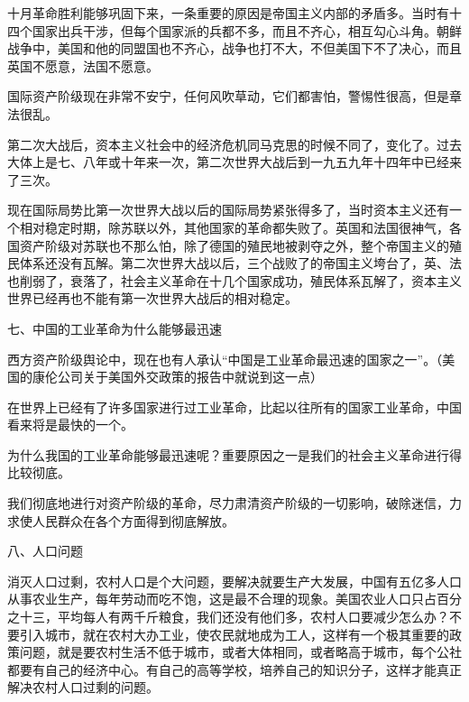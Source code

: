 十月革命胜利能够巩固下来，一条重要的原因是帝国主义内部的矛盾多。当时有十四个国家出兵干涉，但每个国家派的兵都不多，而且不齐心，相互勾心斗角。朝鲜战争中，美国和他的同盟国也不齐心，战争也打不大，不但美国下不了决心，而且英国不愿意，法国不愿意。

国际资产阶级现在非常不安宁，任何风吹草动，它们都害怕，警惕性很高，但是章法很乱。

第二次大战后，资本主义社会中的经济危机同马克思的时候不同了，变化了。过去大体上是七、八年或十年来一次，第二次世界大战后到一九五九年十四年中已经来了三次。

现在国际局势比第一次世界大战以后的国际局势紧张得多了，当时资本主义还有一个相对稳定时期，除苏联以外，其他国家的革命都失败了。英国和法国很神气，各国资产阶级对苏联也不那么怕，除了德国的殖民地被剥夺之外，整个帝国主义的殖民体系还没有瓦解。第二次世界大战以后，三个战败了的帝国主义垮台了，英、法也削弱了，衰落了，社会主义革命在十几个国家成功，殖民体系瓦解了，资本主义世界已经再也不能有第一次世界大战后的相对稳定。

七、中国的工业革命为什么能够最迅速

西方资产阶级舆论中，现在也有人承认“中国是工业革命最迅速的国家之一”。（美国的康伦公司关于美国外交政策的报告中就说到这一点）

在世界上已经有了许多国家进行过工业革命，比起以往所有的国家工业革命，中国看来将是最快的一个。

为什么我国的工业革命能够最迅速呢？重要原因之一是我们的社会主义革命进行得比较彻底。

我们彻底地进行对资产阶级的革命，尽力肃清资产阶级的一切影响，破除迷信，力求使人民群众在各个方面得到彻底解放。

八、人口问题

消灭人口过剩，农村人口是个大问题，要解决就要生产大发展，中国有五亿多人口从事农业生产，每年劳动而吃不饱，这是最不合理的现象。美国农业人口只占百分之十三，平均每人有两千斤粮食，我们还没有他们多，农村人口要减少怎么办？不要引入城市，就在农村大办工业，使农民就地成为工人，这样有一个极其重要的政策问题，就是要农村生活不低于城市，或者大体相同，或者略高于城市，每个公社都要有自己的经济中心。有自己的高等学校，培养自己的知识分子，这样才能真正解决农村人口过剩的问题。


